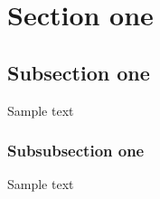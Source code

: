 \documentclass[12pt,a4paper]{article}
\begin{document}
\sffamily

\section{Section one}

\subsection{Subsection one}
Sample text

\subsubsection{Subsubsection one}
Sample text
\end{document}
